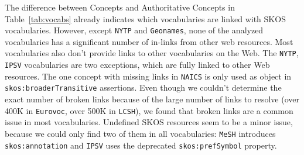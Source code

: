 
The difference between Concepts and Authoritative Concepts in Table~\ref{tab:vocabs} already indicates which vocabularies are linked with SKOS vocabularies.
However, except \texttt{NYTP} and \texttt{Geonames}, none of the analyzed vocabularies has a significant number of in-links from other web resources.
Most vocabularies also don't provide links to other vocabularies on the Web. The \texttt{NYTP}, \texttt{IPSV} vocabularies are two exceptions, which are fully linked to other Web resources. The one concept with missing links in \texttt{NAICS} is only used as object in \texttt{skos:broaderTransitive} assertions.
Even though we couldn't determine the exact number of broken links because of the large number of links to resolve  (over 400K in \texttt{Eurovoc}, over 500K in \texttt{LCSH}), we found that broken links are a common issue in most vocabularies.
Undefined SKOS resources seem to be a minor issue, because we could only find two of them in all vocabularies: \texttt{MeSH} introduces \texttt{skos:annotation} and \texttt{IPSV} uses the deprecated \texttt{skos:prefSymbol} property.
